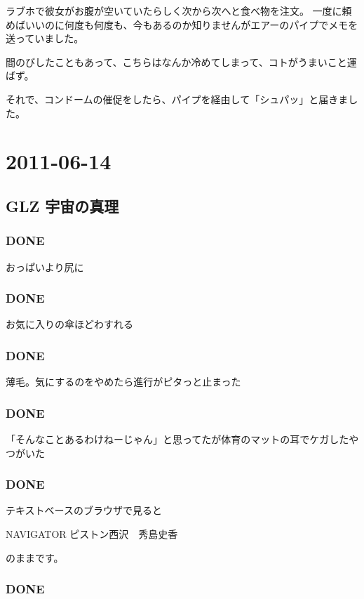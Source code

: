 \documentclass[11pt]{article}
\begin{document}
ラブホで彼女がお腹が空いていたらしく次から次へと食べ物を注文。
一度に頼めばいいのに何度も何度も、今もあるのか知りませんがエアーのパイプでメモを送っていました。

間のびしたこともあって、こちらはなんか冷めてしまって、コトがうまいこと運ばず。

それで、コンドームの催促をしたら、パイプを経由して「シュパッ」と届きました。
\section{2011-06-14}
\label{sec-109}
\subsection{GLZ 宇宙の真理}
\label{sec-109_1}
\subsubsection{\textbf{DONE}}
\label{sec-109_1_1}

おっぱいより尻に
\subsubsection{\textbf{DONE}}
\label{sec-109_1_2}

お気に入りの傘ほどわすれる
\subsubsection{\textbf{DONE}}
\label{sec-109_1_3}

薄毛。気にするのをやめたら進行がピタっと止まった
\subsubsection{\textbf{DONE}}
\label{sec-109_1_4}

「そんなことあるわけねーじゃん」と思ってたが体育のマットの耳でケガしたやつがいた
\subsubsection{\textbf{DONE}}
\label{sec-109_1_5}

テキストベースのブラウザで見ると

NAVIGATOR ピストン西沢　秀島史香

のままです。
\subsubsection{\textbf{DONE}}
\label{sec-109_1_6}
\end{document}
